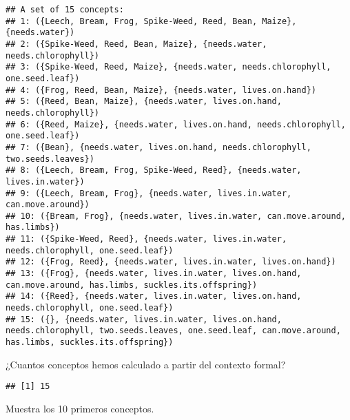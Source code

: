 \documentclass[
]{book}
\newenvironment{Shaded}{\begin{snugshade}}{\end{snugshade}}
\newcommand{\DecValTok}[1]{\textcolor[rgb]{0.00,0.00,0.81}{#1}}
\newcommand{\FunctionTok}[1]{\textcolor[rgb]{0.00,0.00,0.00}{#1}}
\newcommand{\NormalTok}[1]{#1}
\newcommand{\SpecialCharTok}[1]{\textcolor[rgb]{0.00,0.00,0.00}{#1}}
\begin{document}
\begin{verbatim}
## A set of 15 concepts:
## 1: ({Leech, Bream, Frog, Spike-Weed, Reed, Bean, Maize}, {needs.water})
## 2: ({Spike-Weed, Reed, Bean, Maize}, {needs.water, needs.chlorophyll})
## 3: ({Spike-Weed, Reed, Maize}, {needs.water, needs.chlorophyll, one.seed.leaf})
## 4: ({Frog, Reed, Bean, Maize}, {needs.water, lives.on.hand})
## 5: ({Reed, Bean, Maize}, {needs.water, lives.on.hand, needs.chlorophyll})
## 6: ({Reed, Maize}, {needs.water, lives.on.hand, needs.chlorophyll, one.seed.leaf})
## 7: ({Bean}, {needs.water, lives.on.hand, needs.chlorophyll, two.seeds.leaves})
## 8: ({Leech, Bream, Frog, Spike-Weed, Reed}, {needs.water, lives.in.water})
## 9: ({Leech, Bream, Frog}, {needs.water, lives.in.water, can.move.around})
## 10: ({Bream, Frog}, {needs.water, lives.in.water, can.move.around, has.limbs})
## 11: ({Spike-Weed, Reed}, {needs.water, lives.in.water, needs.chlorophyll, one.seed.leaf})
## 12: ({Frog, Reed}, {needs.water, lives.in.water, lives.on.hand})
## 13: ({Frog}, {needs.water, lives.in.water, lives.on.hand, can.move.around, has.limbs, suckles.its.offspring})
## 14: ({Reed}, {needs.water, lives.in.water, lives.on.hand, needs.chlorophyll, one.seed.leaf})
## 15: ({}, {needs.water, lives.in.water, lives.on.hand, needs.chlorophyll, two.seeds.leaves, one.seed.leaf, can.move.around, has.limbs, suckles.its.offspring})
\end{verbatim}

¿Cuantos conceptos hemos calculado a partir del contexto formal?

\begin{Shaded}
\end{Shaded}

\begin{verbatim}
## [1] 15
\end{verbatim}

Muestra los 10 primeros conceptos.

\begin{Shaded}
\end{Shaded}
\end{document}
